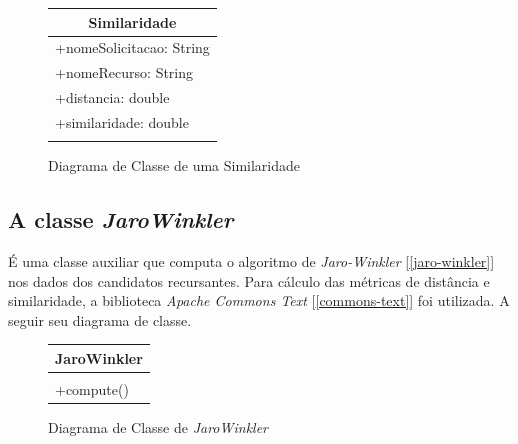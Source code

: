 \documentclass[
	12pt,			%
	openright,		%
	oneside,	
	a4paper,		%
	english,		%
	brazil			%
]{abntex2/abntex2}  %
\begin{document}
				\begin{figure}[ht]
					\begin{center}
						
						\caption{Diagrama de Classe de uma Similaridade}
						
						\begin{tabular}{|l|}
							\hline
							\multicolumn{1}{|c|}{\textbf{Similaridade}} \\ \hline
							+nomeSolicitacao: String                    \\
							+nomeRecurso: String                        \\
							+distancia: double                          \\
							+similaridade: double                       \\ \hline
							\\ \hline
						\end{tabular}
						
					\end{center}
				\end{figure}

			\subsection{A classe \textit{JaroWinkler}}
			
				É uma classe auxiliar que computa o algoritmo de \textit{Jaro-Winkler} [\ref{jaro-winkler}] nos dados dos candidatos recursantes. Para cálculo das métricas de distância e similaridade, a biblioteca \textit{Apache Commons Text\texttrademark} [\ref{commons-text}] foi utilizada. A seguir seu diagrama de classe.
			
				\begin{figure}[ht]
					\begin{center}
						
						\caption{Diagrama de Classe de \textit{JaroWinkler}}
						
						\begin{tabular}{|l|}
							\hline
							\multicolumn{1}{|c|}{\textbf{JaroWinkler}} \\ \hline
							\\ \hline
							+compute()                                \\ \hline
						\end{tabular}
						
					\end{center}
				\end{figure}
\end{document}
